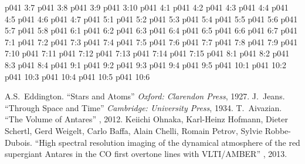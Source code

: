 \vs p041 3:7 
\vs p041 3:8 \pc 
\vs p041 3:9 
\vs p041 3:10 
\vs p041 4:1 
\vs p041 4:2 \pc 
\vs p041 4:3 \pc 
\vs p041 4:4 
\vs p041 4:5 
\vs p041 4:6 
\vs p041 4:7 
\vs p041 5:1 
\vs p041 5:2 
\vs p041 5:3 
\vs p041 5:4 
\vs p041 5:5 
\vs p041 5:6 \pc 
\vs p041 5:7 \pc 
\vs p041 5:8 
\vs p041 6:1 
\vs p041 6:2 
\vs p041 6:3 \pc 
\vs p041 6:4 
\vs p041 6:5 
\vs p041 6:6 \pc 
\vs p041 6:7 \pc 
{}
\vs p041 7:1 
\vs p041 7:2 
\vs p041 7:3 \pc 
\vs p041 7:4 
\vs p041 7:5 
\vs p041 7:6 
\vs p041 7:7 
\vs p041 7:8 
\vs p041 7:9 
\vs p041 7:10 
\vs p041 7:11 \pc 
\vs p041 7:12 \pc 
\vs p041 7:13 
\vs p041 7:14 \pc 
\vs p041 7:15 
\vs p041 8:1 
\vs p041 8:2 \pc 
\vs p041 8:3 \pc 
\vs p041 8:4 
\vs p041 9:1 
\vs p041 9:2 \pc 
\vs p041 9:3 \pc 
\vs p041 9:4 
\vs p041 9:5 
\vs p041 10:1 
\vs p041 10:2 
\vs p041 10:3 \pc 
\vs p041 10:4 
\vs p041 10:5 \pc 
\vsetoff
\vs p041 10:6 
\quizlink
\begin{thebibliography}{100}
A.S.~Eddington.
{``Stars and Atoms''}
{\em Oxford: Clarendon Press}, 1927.
J.~Jeans.
{``Through Space and Time''}
{\em Cambridge: University Press}, 1934.
T.~Aivazian.
{``The Volume of Antares''}
{\em {}}, 2012.
Keiichi Ohnaka, Karl-Heinz Hofmann, Dieter Schertl, Gerd Weigelt, Carlo Baffa, Alain Chelli, Romain Petrov, Sylvie Robbe-Dubois.
{``High spectral resolution imaging of the dynamical atmosphere of the red supergiant Antares in the CO first overtone lines with VLTI/AMBER''}
{\em {}}, 2013.
\end{thebibliography}
